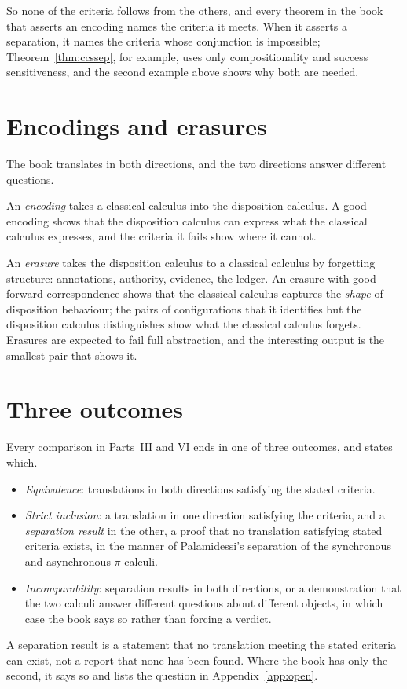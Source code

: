\documentclass[11pt,openany]{book}
\theoremstyle{remark}
\begin{document}
So none of the criteria follows from the others, and every theorem in the
book that asserts an encoding names the criteria it meets. When it
asserts a separation, it names the criteria whose conjunction is
impossible; Theorem~\ref{thm:ccssep}, for example, uses only
compositionality and success sensitiveness, and the second example above
shows why both are needed.

\section{Encodings and erasures}

The book translates in both directions, and the two directions answer
different questions.

An \emph{encoding} takes a classical calculus into the disposition
calculus. A good encoding shows that the disposition calculus can express
what the classical calculus expresses, and the criteria it fails show
where it cannot.

An \emph{erasure} takes the disposition calculus to a classical calculus
by forgetting structure: annotations, authority, evidence, the ledger.
An erasure with good forward correspondence shows that the classical
calculus captures the \emph{shape} of disposition behaviour; the pairs of
configurations that it identifies but the disposition calculus
distinguishes show what the classical calculus forgets. Erasures are
expected to fail full abstraction, and the interesting output is the
smallest pair that shows it.

\section{Three outcomes}

Every comparison in Parts~III and VI ends in one of three outcomes, and
states which.
\begin{itemize}[leftmargin=1.5em]
\item \emph{Equivalence}: translations in both directions satisfying the
stated criteria.
\item \emph{Strict inclusion}: a translation in one direction satisfying
the criteria, and a \emph{separation result} in the other, a proof that no
translation satisfying stated criteria exists, in the manner of
Palamidessi's separation of the synchronous and asynchronous
$\pi$-calculi.
\item \emph{Incomparability}: separation results in both directions, or a
demonstration that the two calculi answer different questions about
different objects, in which case the book says so rather than forcing a
verdict.
\end{itemize}
A separation result is a statement that no translation meeting the stated
criteria can exist, not a report that none has been found. Where the book
has only the second, it says so and lists the question in
Appendix~\ref{app:open}.
\end{document}
